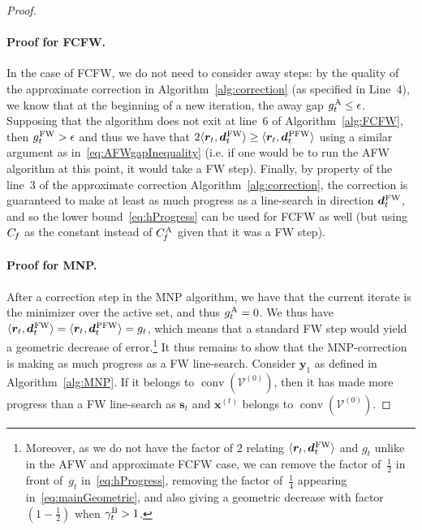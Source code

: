 \documentclass{article} %
\DeclareMathOperator*{\conv}{conv}
\newcommand{\stepsize}{\gamma}
\newcommand{\stepbound}{\stepsize^\textnormal{\scriptsize B}} %
\newcommand{\FW}{{\hspace{0.05em}\textnormal{FW}}}
\newcommand{\PFW}{{\hspace{0.05em}\textnormal{PFW}}}
\newcommand{\away}{{\hspace{0.06em}\textnormal{\scriptsize A}}}
\newcommand{\Cf}{C_{\hspace{-0.08em}f}}
\newcommand{\CfAFW}{C_{\hspace{-0.08em}f}^\away}
\newcommand{\x}{\bm{x}}
\newcommand{\y}{\bm{y}}
\newcommand{\s}{\bm{s}}
\newcommand{\dd}{\bm{d}}
\newcommand{\VVertices}{\mathcal{V}}
\renewcommand{\r}{\bm{r}}
\newcommand{\innerProdCompressed}[2]{\langle #1 , #2 \rangle}
\newcommand{\0}{\mathbf{0}} %
\begin{document}
\begin{proof}
\paragraph{Proof for FCFW.}
In the case of FCFW, we do not need to consider away steps: by the quality of the 
approximate correction in Algorithm~\ref{alg:correction} (as specified in Line~4), we know that at the
beginning of a new iteration, the away gap $g_t^\away \leq \epsilon$.
Supposing that the algorithm does not exit at line~6 of
Algorithm~\ref{alg:FCFW}, then $g_t^\FW > \epsilon$ and thus we have that $2
\innerProdCompressed{\r_t}{\dd_t^\FW} \geq
\innerProdCompressed{\r_t}{\dd_t^\PFW}$ using a similar argument as
in~\eqref{eq:AFWgapInequality} (i.e. if one would be to run the AFW algorithm at this point, it
would take a FW step). Finally, by property of the line~3 of the approximate correction
Algorithm~\ref{alg:correction}, the correction is
guaranteed to make at least as much progress as a line-search in direction
$\dd_t^\FW$, and so the lower bound~\eqref{eq:hProgress} can be
used for FCFW as well (but using $\Cf$ as the constant instead of $\CfAFW$ given that it was a FW step).

\paragraph{Proof for MNP.}
After a correction step in the MNP algorithm, we have that the current iterate is the minimizer over the active set, and thus $g_t^\away = 0$. We thus have $\innerProdCompressed{\r_t}{\dd_t^\FW} = \innerProdCompressed{\r_t}{\dd_t^\PFW} = g_t$, which means that a standard FW step would yield a geometric decrease of error.\footnote{Moreover, as we do not have the factor of $2$ relating $\innerProdCompressed{\r_t}{\dd_t^\FW}$ and $g_t$ unlike in the AFW and approximate FCFW case,
we can remove the factor of~$\frac{1}{2}$ in front of~$g_t$ in~\eqref{eq:hProgress}, removing
the factor of~$\frac{1}{4}$ appearing in~\eqref{eq:mainGeometric},
and also giving a geometric decrease with factor $(1-\frac{1}{2})$ when $\stepbound_t > 1$.}
It thus remains to show that the MNP-correction is making as much progress as a FW line-search. Consider $\y_1$ as defined in Algorithm~\ref{alg:MNP}. If it belongs to $\conv(\VVertices^{(0)})$, then it has made more progress than a FW line-search as $\s_t$ and $\x^{(t)}$ belongs to $\conv(\VVertices^{(0)})$. 


\end{proof}
\end{document}
